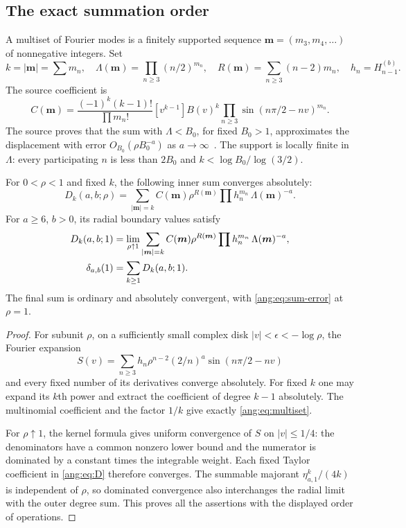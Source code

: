 \subsection{The exact summation order}

A multiset of Fourier modes is a finitely supported sequence
$\boldsymbol m=(m_3,m_4,\ldots)$ of nonnegative integers. Set
\[
 k=|\boldsymbol m|=\sum m_n,\quad
 \Lambda(\boldsymbol m)=\prod_{n\ge3}(n/2)^{m_n},\quad
 R(\boldsymbol m)=\sum_{n\ge3}(n-2)m_n,
 \quad h_n=H_{n-1}^{(b)}.
\]
The source coefficient is
\begin{equation}
 C(\boldsymbol m)=\frac{(-1)^k(k-1)!}{\prod m_n!}
 [v^{k-1}]B(v)^k
 \prod_{n\ge3}\sin(n\pi/2-nv)^{m_n}.
 \label{ang:eq:multiset}
\end{equation}
The source proves that the sum with $\Lambda<B_0$, for fixed
$B_0>1$, approximates the displacement with error
$O_{B_0}(\rho B_0^{-a})$ as $a\to\infty$~\cite{RepoAngular}.
The support is locally finite in $\Lambda$: every participating
$n$ is less than $2B_0$ and $k<\log B_0/\log(3/2)$.

\begin{theorem}
\label{ang:thm:Abel}
For $0<\rho<1$ and fixed $k$, the following inner sum converges
absolutely:
\begin{equation}
 D_k(a,b;\rho)=\sum_{|\boldsymbol m|=k}
 C(\boldsymbol m)\rho^{R(\boldsymbol m)}
 \prod h_n^{m_n}\,\Lambda(\boldsymbol m)^{-a}.
 \label{ang:eq:blocks}
\end{equation}
For $a\ge6$, $b>0$, its radial boundary values satisfy
\begin{align}
 D_k(a,b;1)&=\lim_{\rho\uparrow1}
  \sum_{|\boldsymbol m|=k}
  C(\boldsymbol m)\rho^{R(\boldsymbol m)}
  \prod h_n^{m_n}\,\Lambda(\boldsymbol m)^{-a},\notag\\
 \delta_{a,b}(1)&=\sum_{k\ge1}D_k(a,b;1).
 \label{ang:eq:Abel}
\end{align}
The final sum is ordinary and absolutely convergent, with
\eqref{ang:eq:sum-error} at $\rho=1$.
\end{theorem}
\begin{proof}
For subunit $\rho$, on a sufficiently small complex disk
$|v|<\epsilon<-\log\rho$, the Fourier expansion
\[
 S(v)=\sum_{n\ge3}h_n\rho^{n-2}(2/n)^a
                    \sin(n\pi/2-nv)
\]
and every fixed number of its derivatives converge absolutely.
For fixed $k$ one may expand its $k$th power and extract the
coefficient of degree $k-1$ absolutely. The multinomial coefficient
and the factor $1/k$ give exactly \eqref{ang:eq:multiset}.

For $\rho\uparrow1$, the kernel formula gives uniform convergence
of $S$ on $|v|\le1/4$: the denominators have a common nonzero
lower bound and the numerator is dominated by a constant times the
integrable weight. Each fixed Taylor coefficient in
\eqref{ang:eq:D} therefore converges. The summable majorant
$\eta_{a,1}^k/(4k)$ is independent of $\rho$, so dominated
convergence also interchanges the radial limit with the outer degree
sum. This proves all the assertions with the displayed order of
operations.
\end{proof}

